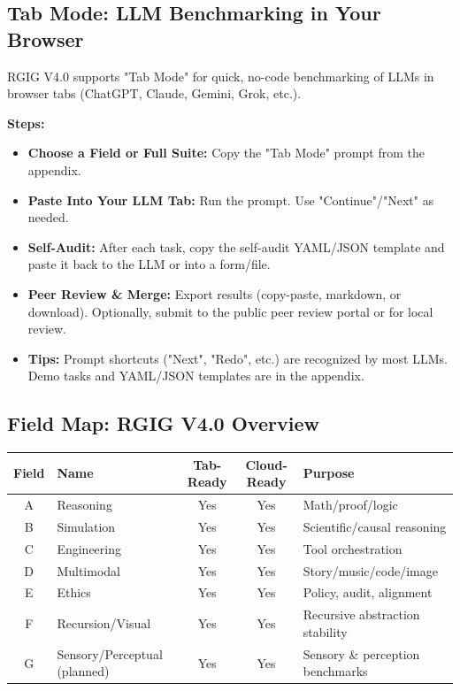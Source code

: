 \documentclass[11pt]{article}
\begin{document}
\subsection*{Tab Mode: LLM Benchmarking in Your Browser}
RGIG V4.0 supports "Tab Mode" for quick, no-code benchmarking of LLMs in browser tabs (ChatGPT, Claude, Gemini, Grok, etc.).

\textbf{Steps:}
\begin{itemize}
  \item \textbf{Choose a Field or Full Suite:} Copy the "Tab Mode" prompt from the appendix.
  \item \textbf{Paste Into Your LLM Tab:} Run the prompt. Use "Continue"/"Next" as needed.
  \item \textbf{Self-Audit:} After each task, copy the self-audit YAML/JSON template and paste it back to the LLM or into a form/file.
  \item \textbf{Peer Review \& Merge:} Export results (copy-paste, markdown, or download). Optionally, submit to the public peer review portal or for local review.
  \item \textbf{Tips:} Prompt shortcuts ("Next", "Redo", etc.) are recognized by most LLMs. Demo tasks and YAML/JSON templates are in the appendix.
\end{itemize}

\subsection*{Field Map: RGIG V4.0 Overview}
\begin{center}
\begin{tabular}{|c|l|c|c|l|}
\hline
Field & Name & Tab-Ready & Cloud-Ready & Purpose \\
\hline
A & Reasoning & Yes & Yes & Math/proof/logic \\
B & Simulation & Yes & Yes & Scientific/causal reasoning \\
C & Engineering & Yes & Yes & Tool orchestration \\
D & Multimodal & Yes & Yes & Story/music/code/image \\
E & Ethics & Yes & Yes & Policy, audit, alignment \\
F & Recursion/Visual & Yes & Yes & Recursive abstraction stability \\
G & Sensory/Perceptual (planned) & Yes & Yes & Sensory \& perception benchmarks \\
\hline
\end{tabular}
\end{center}
\end{document}

